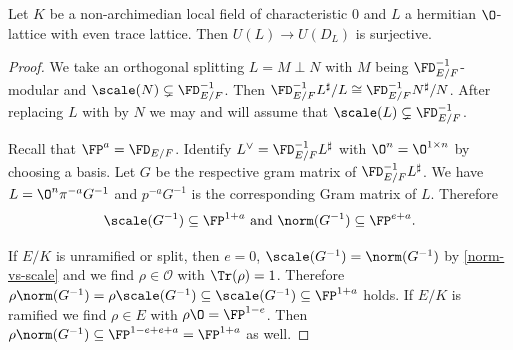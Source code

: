 \begin{theorem}\label{Usurj}
  Let $K$ be a non-archimedian local field of characteristic $0$ and $L$ a hermitian $\O$-lattice with even trace lattice.
 Then
  $U(L) \to U(D_L)$
 is surjective.
\end{theorem}
\begin{proof}
 We take an orthogonal splitting $L = M \perp N$ with $M$ being
 ${\FD_{E/F}^{-1}}$-modular and $\scale(N) \subsetneq {\FD_{E/F}^{-1}}$.
 Then ${\FD_{E/F}^{-1}} L^\sharp/L \cong {\FD_{E/F}^{-1}} N^\sharp/N$.
 After replacing $L$ with by $N$ we may and will assume that $ \scale(L) \subsetneq {\FD_{E/F}^{-1}}$.

 Recall that $\FP^a =\FD_{E/F}$.
  Identify $L^\vee={\FD_{E/F}^{-1}}L^\sharp$ with $\O^n= \O^{1 \times n}$ by choosing a basis. Let $G$ be the respective gram matrix of ${\FD_{E/F}^{-1}}L^\sharp$. We have $L = \O^n \pi^{-a}  G^{-1}$ and $p^{-a} G^{-1}$ is the corresponding Gram matrix of $L$.
 Therefore
 \[\scale(G^{-1}) \subseteq \FP^{1+a} \text{ and }\norm(G^{-1})\subseteq \FP^{e+a}.\]

 If $E/K$ is unramified or split, then $e=0$, $\scale(G^{-1})=\norm(G^{-1})$ by \cref{norm-vs-scale} and we find $\rho \in \mathcal{O}$ with $\Tr(\rho)=1$. Therefore $\rho\norm(G^{-1}) =\rho \scale(G^{-1}) \subseteq \scale(G^{-1})\subseteq \FP^{1+a}$ holds.
 If $E/K$ is ramified we find $\rho \in E$ with $\rho \O = \FP^{1-e}$. Then
 $\rho \norm(G^{-1}) \subseteq \FP^{1-e+e+a}=\FP^{1+a}$ as well.


\end{proof}
